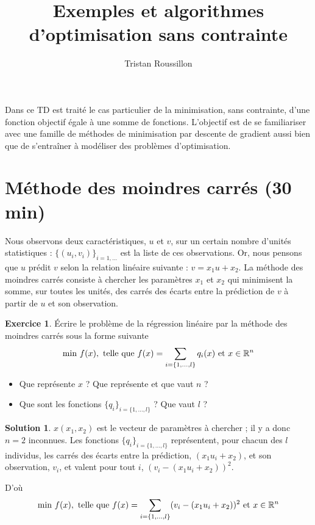 \documentclass[a4paper,francais]{article}
\title{Exemples et algorithmes d'optimisation sans contrainte}
\author{Tristan Roussillon}
\newcommand{\R}{{\ensuremath\mathbb{R}}}
\theoremstyle{definition}
\newtheorem{exercice}{Exercice}[section]
\newtheorem*{solution}{Solution}
\begin{document}
\maketitle

Dans ce TD est traité le cas particulier de la minimisation, sans contrainte,
d'une fonction objectif égale à une somme de fonctions. L'objectif est de se
familiariser avec une famille de méthodes de minimisation par descente de
gradient aussi bien que de s'entraîner à modéliser des problèmes d'optimisation.

\section{Méthode des moindres carrés (30 min)}

Nous observons deux caractéristiques, $u$ et $v$, sur un certain nombre d'unités
statistiques :
$\{(u_i,v_i)\}_{i = 1,\dots}$ est la liste de ces observations.
Or, nous pensons que $u$ prédit $v$ selon la relation linéaire suivante :
$v = x_1u + x_2$. La méthode des moindres carrés
consiste à chercher les paramètres $x_1$ et $x_2$ qui minimisent
la somme, sur toutes les unités, des carrés des écarts entre la prédiction
de $v$ à partir de $u$ et son observation. 

\begin{exercice}
  \'Ecrire le problème de la régression linéaire par la méthode des moindres carrés
  sous la forme suivante
  \[
  \text{min} \ f(x), \ \text{telle que} \
  f(x) = \sum_{i = \{1,\dots,l\}} q_i(x) \ \text{et} \ x \in \R^n
  \]

  \begin{itemize}
  \item Que représente $x$ ? Que représente et que vaut $n$ ?
  \item Que sont les fonctions $\{q_i\}_{i = \{1,\dots,l\}}$ ? Que vaut $l$ ?
  \end{itemize}
\end{exercice}

\begin{solution}
  $x(x_1,x_2)$ est le vecteur de paramètres à chercher ; il y a donc $n=2$ inconnues.
  Les fonctions $\{q_i\}_{i = \{1,\dots,l\}}$ représentent, pour chacun des $l$ individus, les carrés des
  écarts entre la prédiction, $(x_1u_i + x_2)$, et son observation, $v_i$, et valent pour tout $i$,
  $(v_i - (x_1u_i + x_2))^2$.

  D'où
  \[
  \text{min} \ f(x), \ \text{telle que} \
  f(x) = \sum_{i = \{1,\dots,l\}} (v_i - (x_1u_i + x_2))^2 \ \text{et} \ x \in \R^n
  \]
\end{solution}
\end{document}
